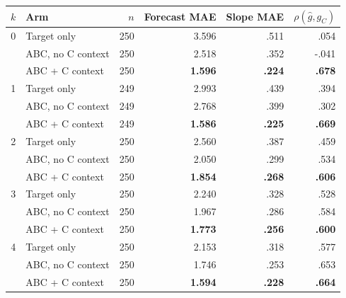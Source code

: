 \begin{center}
\begin{minipage}{\linewidth}
\centering
{}
\label{tab:coin-city-recovery-gpt56}
\small
\begin{tabular}{c l r r r r}
\toprule
$k$ & Arm & $n$ & Forecast MAE & Slope MAE & $\rho(\hat g,g_C)$ \\
\midrule
0 & Target only & 250 & 3.596 & .511 & .054 \\
  & ABC, no C context & 250 & 2.518 & .352 & -.041 \\
  & ABC + C context & 250 & \textbf{1.596} & \textbf{.224} & \textbf{.678} \\
\midrule
1 & Target only & 249 & 2.993 & .439 & .394 \\
  & ABC, no C context & 249 & 2.768 & .399 & .302 \\
  & ABC + C context & 249 & \textbf{1.586} & \textbf{.225} & \textbf{.669} \\
\midrule
2 & Target only & 250 & 2.560 & .387 & .459 \\
  & ABC, no C context & 250 & 2.050 & .299 & .534 \\
  & ABC + C context & 250 & \textbf{1.854} & \textbf{.268} & \textbf{.606} \\
\midrule
3 & Target only & 250 & 2.240 & .328 & .528 \\
  & ABC, no C context & 250 & 1.967 & .286 & .584 \\
  & ABC + C context & 250 & \textbf{1.773} & \textbf{.256} & \textbf{.600} \\
\midrule
4 & Target only & 250 & 2.153 & .318 & .577 \\
  & ABC, no C context & 250 & 1.746 & .253 & .653 \\
  & ABC + C context & 250 & \textbf{1.594} & \textbf{.228} & \textbf{.664} \\
\bottomrule
\end{tabular}
\end{minipage}
\end{center}

